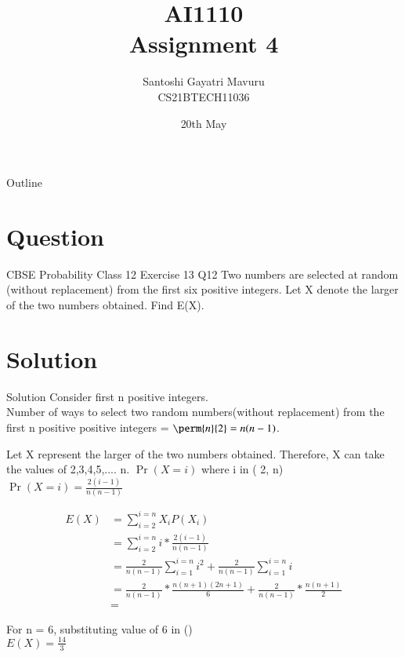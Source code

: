 \documentclass{beamer}
\title{AI1110 \\ Assignment 4}
\author{Santoshi Gayatri Mavuru \\ CS21BTECH11036}
\date{20th May}
\providecommand{\pr}[1]{\ensuremath{\Pr\left(#1\right)}}
\begin{document}
\begin{frame}
\titlepage
\end{frame}
	
\begin{frame}{Outline}
\tableofcontents
\end{frame}
	
\section{Question}
\begin{frame}{CBSE Probability Class 12 Exercise 13 Q12}
Two numbers are selected at random (without replacement) from the first six positive integers. Let X denote the larger of the two numbers obtained. Find E(X).
\end{frame}

\section{Solution}
\begin{frame}{Solution}
Consider first n positive integers.\\
Number of ways to select two random numbers(without replacement) from the first n positive positive integers = 
$ \perm{n}{2} = n(n-1)$. 
\end{frame}

\begin{frame}
Let X represent the larger of the two numbers obtained. Therefore, X can take the values of 2,3,4,5,.... n.
\pr{X=i} where i in ( 2, n)
$ \pr{X=i} = \frac{2(i-1)}{n(n-1)} $
\end{frame}

\begin{frame}
\begin{align}
 E(X) &=\sum_{i = 2}^{i = n}X_iP(X_i) \\
 & = \sum_{i = 2}^{i = n} i * \frac{2(i-1)}{n(n-1)}\\
 & = \frac{2}{n(n-1)} \sum_{i = 1}^{i = n} i^2 + \frac{2}{n(n-1)}\sum_{i = 1}^{i = n} i\\
 & = \frac{2}{n(n-1)} *\frac{n(n+1)(2n+1)}{6} + \frac{2}{n(n-1)} * \frac{n(n+1)}{2}\\
 & = 
 \end{align}
\end{frame}

\begin{frame}
For n = 6, substituting value of 6 in ()\\
$ E(X) = \frac{14}{3} $
\end{frame}
\end{document}
